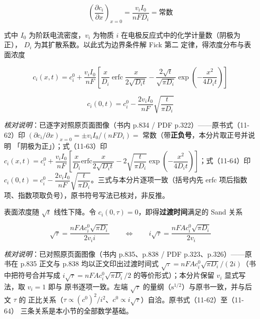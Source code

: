\begin{equation}
\left(\frac{\partial c_i}{\partial x}\right)_{x=0}=\frac{v_i I_0}{nFD_i}=\text{常数}
\label{eq:chrono-bc}
\end{equation}

式中 $I_0$ 为阶跃电流密度，$v_i$ 为物质 $i$ 在电极反应式中的化学计量数（阴极为正），
$D_i$ 为其扩散系数。以此式为边界条件解 Fick 第二
定律，得浓度分布与表面浓度

\begin{equation}
c_i(x,t)=c_i^{0}+\frac{v_i I_0}{nF}\left[\frac{x}{D_i}
\operatorname{erfc}\frac{x}{2\sqrt{D_i t}}
-\frac{2\sqrt{t}}{\sqrt{\pi D_i}}\exp\!\left(-\frac{x^{2}}{4D_i t}\right)\right]
\label{eq:chrono-cixt}
\end{equation}

\begin{equation}
c_i(0,t)=c_i^{0}-\frac{2v_i I_0}{nF}\sqrt{\frac{t}{\pi D_i}}
\label{eq:chrono-c0t}
\end{equation}

\emph{核对说明}：已逐字对照原页面图像（书内 p.834 / PDF p.322）——原书式（11-62）印
$(\partial c_i/\partial x)_{x=0}=\pm v_iI_0/(nFD_i)=$ 常数（带\textbf{正负号}，本分片取正号并说明
「阴极为正」）；式（11-63）印
$c_i(x,t)=c_i^{0}+\dfrac{v_iI_0}{nF}\left[\dfrac{x}{D_i}\mathrm{erfc}\dfrac{x}{2\sqrt{D_it}}
-2\sqrt{\dfrac{t}{\pi D_i}}\exp\!\left(-\dfrac{x^2}{4D_it}\right)\right]$；式（11-64）印
$c_i(0,t)=c_i^{0}-\dfrac{2v_iI_0}{nF}\sqrt{\dfrac{t}{\pi D_i}}$。三式与本分片逐项一致（括号内先
erfc 项后指数项、指数项取负号），原书符号写法已核对，非反推。

表面浓度随 $\sqrt{t}$ 线性下降。令 $c_i(0,\tau)=0$，即得\textbf{过渡时间}满足的
Sand 关系

\begin{equation}
\sqrt{\tau}=\frac{nFAc_i^{0}\sqrt{\pi D_i}}{2v_i i}
\qquad\Longleftrightarrow\qquad
i\sqrt{\tau}=\frac{nFAc_i^{0}\sqrt{\pi D_i}}{2v_i}
\label{eq:sand}
\end{equation}

\emph{核对说明}：已对照原页面图像（书内 p.835、p.838 / PDF p.323、p.326）——原书在 p.835 正文与
p.838 均以正文印出过渡时间式 $\sqrt{\tau}=nFAc_i^{0}\sqrt{\pi D_i}/(2i)$（书中把符号合并写成
$i\sqrt{\tau}=nFAc_i^{0}\sqrt{\pi D_i}/2$ 的等价形式）；本分片保留 $v_i$ 显式写法，取 $v_i=1$ 即与
原书逐项一致。左端 $\sqrt{\tau}$ 的量纲（$\mathrm{s^{1/2}}$）与原书一致，并与后文 $\tau$ 的
正比关系（$\tau\propto(c^0)^2/i^2$、$c^0\propto i\sqrt{\tau}$）自洽。原书式（11-62）至（11-64）
三条关系是本小节的全部数学基础。

